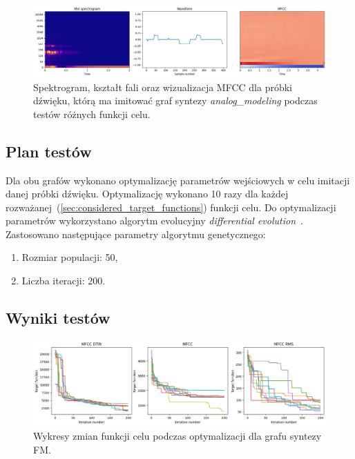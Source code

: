 \begin{figure}[H]
  \centering
  \includegraphics[width=1.0\linewidth]{rys03/am_training_sample_overview.png}
  \caption{
    Spektrogram, kształt fali oraz wizualizacja MFCC dla próbki dźwięku, którą
    ma imitować graf syntezy \textit{analog\_modeling} podczas testów różnych funkcji celu.
  }\label{fig:am_training_sample_overview}
\end{figure}



\subsection{Plan testów}

Dla obu grafów wykonano optymalizację parametrów wejściowych w celu imitacji danej
próbki dźwięku. Optymalizację wykonano 10 razy dla każdej rozważanej~(\ref{sec:considered_target_functions})
funkcji celu. Do optymalizacji parametrów wykorzystano algorytm evolucyjny
\textit{differential evolution}~\cite{2020SciPy-NMeth}. 
Zastosowano następujące parametry algorytmu genetycznego:

\begin{enumerate}
  \item Rozmiar populacji: 50,
  \item Liczba iteracji: 200.
\end{enumerate}


\subsection{Wyniki testów}\label{sec:fixed_structure_optimisation_results}

\begin{figure}[H]
    \centering
    \includegraphics[width=1.0\linewidth]{rys03/target_functions_progress.png}
    \caption{
      Wykresy zmian funkcji celu podczas optymalizacji dla grafu syntezy FM\@.
    }\label{fig:param_optimisation_results_target_fun_plots}
\end{figure}

